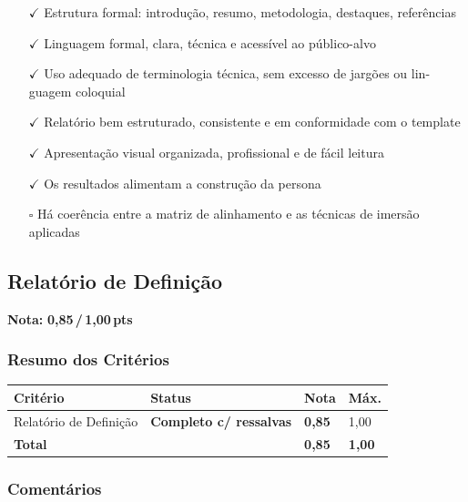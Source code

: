 \documentclass[
  sigconf,
  nonacm, %
  language=portuguese
]{acmart}
\newcommand{\notadestaque}[2]{%
  \noindent\textbf{Nota:}\enspace%
  {\large\bfseries\color{cred}#1\,/\,#2\,pts}%
}
\newcommand{\statuswarn}[1]{{\small\bfseries\color{cwarn}#1}}
\begin{document}
\begin{itemize}[leftmargin=14pt,itemsep=1pt,topsep=3pt,parsep=0pt]
  \item[\textcolor{cgood}{$\checkmark$}] {\small\textcolor{cgood}{Estrutura formal: introdução, resumo, metodologia, destaques, referências}}
  \item[\textcolor{cgood}{$\checkmark$}] {\small\textcolor{cgood}{Linguagem formal, clara, técnica e acessível ao público-alvo}}
  \item[\textcolor{cgood}{$\checkmark$}] {\small\textcolor{cgood}{Uso adequado de terminologia técnica, sem excesso de jargões ou lin- guagem coloquial}}
  \item[\textcolor{cgood}{$\checkmark$}] {\small\textcolor{cgood}{Relatório bem estruturado, consistente e em conformidade com o template}}
  \item[\textcolor{cgood}{$\checkmark$}] {\small\textcolor{cgood}{Apresentação visual organizada, profissional e de fácil leitura}}
  \item[\textcolor{cgood}{$\checkmark$}] {\small\textcolor{cgood}{Os resultados alimentam a construção da persona}}
  \item[$\square$] {\small\textcolor{cmuted}{Há coerência entre a matriz de alinhamento e as técnicas de imersão aplicadas}}
\end{itemize}

\subsection{Relatório de Definição}

\notadestaque{0,85}{1,00}

\subsubsection*{Resumo dos Critérios}

\begin{tabular}{@{} L{2.6cm} C{2.5cm} C{1.1cm} C{1.1cm} @{}}
\toprule
\textbf{Critério} & \textbf{Status} & \textbf{Nota} & \textbf{Máx.} \\
\midrule
Relatório de Definição & \statuswarn{Completo c/ ressalvas} & \textbf{0,85} & 1,00 \\
\midrule
\textbf{Total} & & \textbf{\color{cred}0,85} & \textbf{1,00} \\
\bottomrule
\end{tabular}

\subsubsection*{Comentários}
\end{document}
